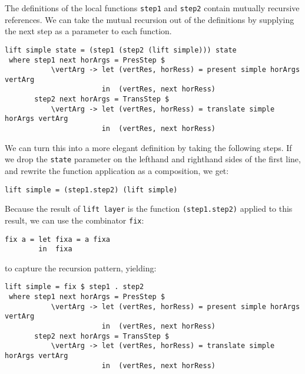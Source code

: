 \par The definitions of the local functions \texttt{step1} and
        \texttt{step2} contain mutually recursive references. We can take the mutual
        recursion out of the definitions by supplying the next step as a parameter to
        each function. 
\par \begin{small}\begin{verbatim}lift simple state = (step1 (step2 (lift simple))) state 
 where step1 next horArgs = PresStep $ 
           \vertArg -> let (vertRes, horRess) = present simple horArgs vertArg                                         
                       in  (vertRes, next horRess)
       step2 next horArgs = TransStep $
           \vertArg -> let (vertRes, horRess) = translate simple horArgs vertArg                     
                       in  (vertRes, next horRess)\end{verbatim}\end{small}

\par We can turn this into a more elegant definition by taking the
        following steps. If we drop the \texttt{state} parameter on the lefthand and righthand sides of the first line, and rewrite
        the function application as a composition, we get:\begin{small}\begin{verbatim}lift simple = (step1.step2) (lift simple)\end{verbatim}\end{small}

\par Because the result of \texttt{lift layer} is the function
        \texttt{(step1.step2)} applied to this result, we can use the combinator
        \texttt{fix}:\begin{small}\begin{verbatim}fix a = let fixa = a fixa
        in  fixa\end{verbatim}\end{small}

\par to capture the recursion pattern, yielding:\begin{small}\begin{verbatim}lift simple = fix $ step1 . step2 
 where step1 next horArgs = PresStep $ 
           \vertArg -> let (vertRes, horRess) = present simple horArgs vertArg                                         
                       in  (vertRes, next horRess)
       step2 next horArgs = TransStep $
           \vertArg -> let (vertRes, horRess) = translate simple horArgs vertArg                     
                       in  (vertRes, next horRess)\end{verbatim}\end{small}

